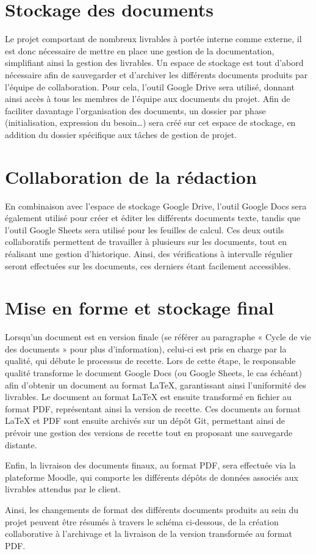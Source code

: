 
\section{Stockage des documents}

Le projet comportant de nombreux livrables à portée interne comme externe, il est donc nécessaire de mettre en place une gestion de la documentation, simplifiant ainsi la gestion des livrables. Un espace de stockage est tout d’abord nécessaire afin de sauvegarder et d’archiver les différents documents produits par l’équipe de collaboration. Pour cela, l’outil Google Drive sera utilisé, donnant ainsi accès à tous les membres de l’équipe aux documents du projet. Afin de faciliter davantage l’organisation des documents, un dossier par phase (initialisation, expression du besoin…) sera créé sur cet espace de stockage, en addition du dossier spécifique aux tâches de gestion de projet.
 

\section{Collaboration de la rédaction}

En combinaison avec l’espace de stockage Google Drive, l’outil Google Docs sera également utilisé pour créer et éditer les différents documents texte, tandis que l’outil Google Sheets sera utilisé pour les feuilles de calcul. Ces deux outils collaboratifs permettent de travailler à plusieurs sur les documents, tout en réalisant une gestion d’historique. Ainsi, des vérifications à intervalle régulier seront effectuées sur les documents, ces derniers étant facilement accessibles.
 
\section{Mise en forme et stockage final}

Lorsqu’un document est en version finale (se référer au paragraphe « Cycle de vie des documents » pour plus d’information), celui-ci est pris en charge par la qualité, qui débute le processus de recette. Lors de cette étape, le responsable qualité transforme le document Google Docs (ou Google Sheets, le cas échéant) afin d’obtenir un document au format LaTeX, garantissant ainsi l’uniformité des livrables. Le document au format LaTeX est ensuite transformé en fichier au format PDF, représentant ainsi la version de recette. Ces documents au format LaTeX et PDF sont ensuite archivés sur un dépôt Git, permettant ainsi de prévoir une gestion des versions de recette tout en proposant une sauvegarde distante.
 
Enfin, la livraison des documents finaux, au format PDF, sera effectuée via la plateforme Moodle, qui comporte les différents dépôts de données associés aux livrables attendus par le client.

Ainsi, les changements de format des différents documents produits au sein du projet peuvent être résumés à travers le schéma ci-dessous, de la création collaborative à l’archivage et la livraison de la version transformée au format PDF.

